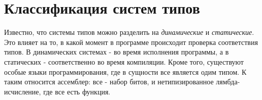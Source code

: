 \chapter{Классификация систем типов}
\label{ch:classification}

Известно, что системы типов можно разделить на \textit{динамические} и \textit{статические}.
Это влияет на то, в какой момент в программе происходит проверка соответствия типов.
В динамических системах - во время исполнения программы, а в статических - соответственно во время компиляции.
Кроме того, существуют особые языки программирования, где в сущности все является одим типом.
К таким относится ассемблер: все - набор битов, и нетипизированное лямбда-исчисление, где все есть функция.


